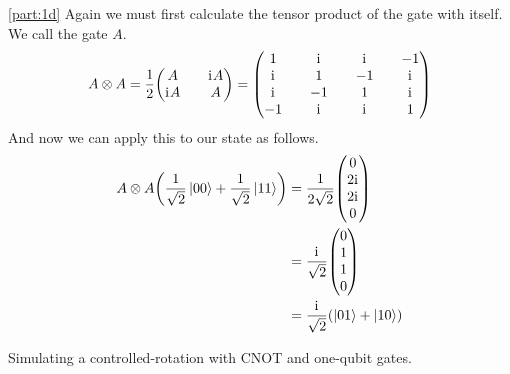 \documentclass[boxes,pages]{homework}
\newcommand{\iu}{\mathrm{i}\mkern1mu}
\begin{document}
\begin{solution}
	\ref{part:1d}
	Again we must first calculate the tensor product of the gate with itself. We call the gate $A$.
	\begin{equation*}
		A\otimes A = \frac{1}{2}\mqty(A && \iu A \\ \iu A && A) = \mqty(1 && \iu && \iu && -1 \\ \iu && 1 && -1 && \iu \\ \iu && -1 && 1 && \iu \\ -1 && \iu && \iu && 1)
	\end{equation*}
	And now we can apply this to our state as follows.
	\begin{align*}
		A\otimes A \qty(\frac{1}{\sqrt{2}}\ket{00} + \frac{1}{\sqrt{2}}\ket{11}) & = \frac{1}{2\sqrt{2}}\mqty(0                    \\ 2\iu \\ 2\iu \\ 0) \\
		                                                                         & = \frac{\iu}{\sqrt{2}}\mqty(0                   \\ 1 \\ 1 \\ 0) \\
		                                                                         & = \frac{\iu}{\sqrt{2}}\qty(\ket{01} + \ket{10})
	\end{align*}
\end{solution}

\begin{problem}
Simulating a controlled-rotation with CNOT and one-qubit gates.
\end{problem}
\end{document}
